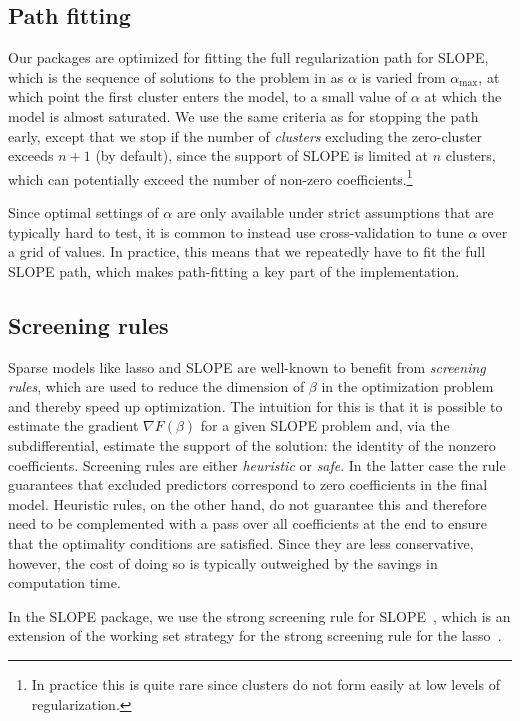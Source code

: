 \documentclass[article]{jss}
\let\Cref\crtCref
\begin{document}
\subsection{Path fitting}

Our packages are optimized for fitting the full regularization path for SLOPE, which
is the sequence of solutions to the problem in \Cref{eq:slope} as \(\alpha\) is varied
from \(\alpha_\text{max}\), at which point the first cluster enters the model,
to a small value of \(\alpha\) at which the model is almost saturated.
We use the same criteria as \citet{friedman2010} for stopping the path early,
except that we stop if the number of \emph{clusters} excluding the zero-cluster
exceeds \(n + 1\) (by default), since the support of SLOPE is limited at \(n\) clusters,
which can potentially exceed the number of non-zero coefficients.\footnote{In practice
  this is quite rare since clusters do not form easily at low levels of regularization.}

Since optimal settings of \(\alpha\) are only available under
strict assumptions that are typically hard to test, it is common to
instead use cross-validation to tune \(\alpha\) over a grid of values.
In practice, this means that we repeatedly have to fit the full SLOPE
path, which makes path-fitting a key part of the implementation.

\subsection{Screening rules}

Sparse models like lasso and SLOPE are well-known to benefit from
\emph{screening rules}, which are used to reduce the dimension of \(\beta\) in
the optimization problem and thereby speed up optimization. The intuition for
this is that it is possible to estimate the gradient \(\nabla F(\beta) \) for a
given SLOPE problem and, via the subdifferential, estimate the support of the
solution: the identity of the nonzero coefficients. Screening rules are
either \emph{heuristic} or \emph{safe}. In the latter case the rule guarantees that
excluded predictors correspond to zero coefficients in the final model. Heuristic
rules, on the other hand, do not guarantee this and therefore need to be
complemented with a pass over all coefficients at the end to ensure that the
optimality conditions are satisfied. Since they are less conservative, however,
the cost of doing so is typically outweighed by the savings in computation
time.

In the SLOPE package, we use the strong screening rule for
SLOPE~\citep{larsson2020a}, which is an extension of the working set strategy
for the strong screening rule for the lasso~\citep{tibshirani2012}.
\end{document}
